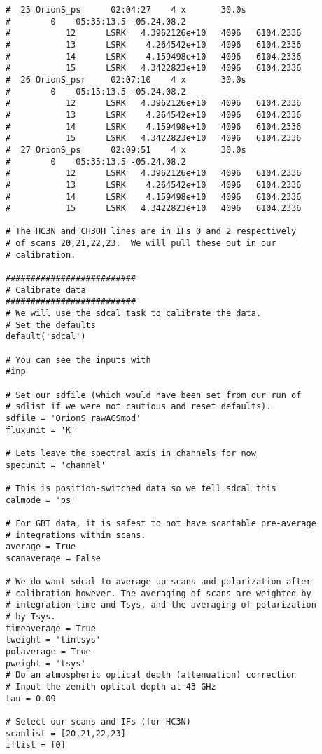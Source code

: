 \begin{verbatim}
#  25 OrionS_ps      02:04:27    4 x       30.0s
#        0    05:35:13.5 -05.24.08.2
#           12      LSRK   4.3962126e+10   4096   6104.2336
#           13      LSRK    4.264542e+10   4096   6104.2336
#           14      LSRK    4.159498e+10   4096   6104.2336
#           15      LSRK   4.3422823e+10   4096   6104.2336
#  26 OrionS_psr     02:07:10    4 x       30.0s
#        0    05:15:13.5 -05.24.08.2
#           12      LSRK   4.3962126e+10   4096   6104.2336
#           13      LSRK    4.264542e+10   4096   6104.2336
#           14      LSRK    4.159498e+10   4096   6104.2336
#           15      LSRK   4.3422823e+10   4096   6104.2336
#  27 OrionS_ps      02:09:51    4 x       30.0s
#        0    05:35:13.5 -05.24.08.2
#           12      LSRK   4.3962126e+10   4096   6104.2336
#           13      LSRK    4.264542e+10   4096   6104.2336
#           14      LSRK    4.159498e+10   4096   6104.2336
#           15      LSRK   4.3422823e+10   4096   6104.2336

# The HC3N and CH3OH lines are in IFs 0 and 2 respectively
# of scans 20,21,22,23.  We will pull these out in our
# calibration.

##########################
# Calibrate data
##########################
# We will use the sdcal task to calibrate the data.
# Set the defaults
default('sdcal')

# You can see the inputs with
#inp

# Set our sdfile (which would have been set from our run of
# sdlist if we were not cautious and reset defaults).
sdfile = 'OrionS_rawACSmod'
fluxunit = 'K'

# Lets leave the spectral axis in channels for now
specunit = 'channel'

# This is position-switched data so we tell sdcal this
calmode = 'ps'

# For GBT data, it is safest to not have scantable pre-average
# integrations within scans.
average = True
scanaverage = False

# We do want sdcal to average up scans and polarization after
# calibration however. The averaging of scans are weighted by 
# integration time and Tsys, and the averaging of polarization 
# by Tsys.
timeaverage = True
tweight = 'tintsys'
polaverage = True
pweight = 'tsys'
# Do an atmospheric optical depth (attenuation) correction
# Input the zenith optical depth at 43 GHz
tau = 0.09

# Select our scans and IFs (for HC3N)
scanlist = [20,21,22,23]
iflist = [0]


\end{verbatim}
